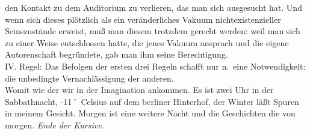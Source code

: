 \documentclass[
]{article}
\begin{document}
den Kontakt zu dem Auditorium zu verlieren, das man sich ausgesucht hat.
Und wenn sich dieses plötzlich als ein veränderliches Vakuum
nichtexistenzieller Seinszustände erweist, muß man diesem trotzdem
gerecht werden: weil man sich zu einer Weise entschlossen hatte, die
jenes Vakuum ansprach und die eigene Autorenschaft begründete, gab man
ihm seine Berechtigung.\\
IV. Regel: Das Befolgen der ersten drei Regeln schafft nur n.~eine
Notwendigkeit: die unbedingte Vernachlässigung der anderen.\\
Womit wie der wir in der Imagination ankommen. Es ist zwei Uhr in der
Sabbathnacht, -11˚ Celsius auf dem berliner Hinterhof, der Winter läßt
Spuren in meinem Gesicht. Morgen ist eine weitere Nacht und die
Geschichten die von morgen. \emph{Ende der Kursive.}
\end{document}
